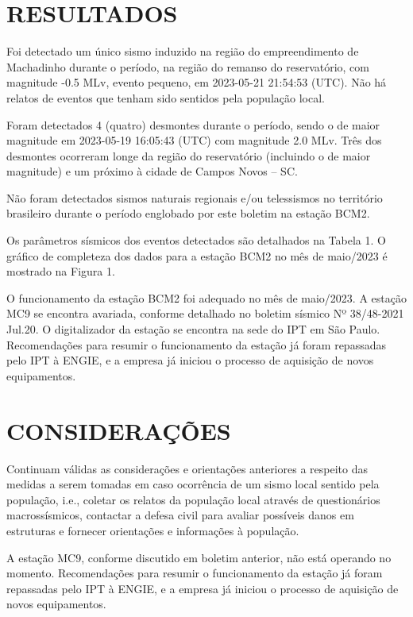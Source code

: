 \documentclass[12pt]{iptex}
\begin{document}
\section{RESULTADOS}
\label{sec:resultados}
Foi detectado um único sismo induzido na região do empreendimento de Machadinho durante o período, na região do remanso do reservatório, com magnitude -0.5 MLv, evento pequeno, em 2023-05-21 21:54:53 (UTC). Não há relatos de eventos que tenham sido sentidos pela população local.

Foram detectados 4 (quatro) desmontes durante o período, sendo o de maior magnitude em 2023-05-19 16:05:43 (UTC) com magnitude 2.0 MLv. Três dos desmontes ocorreram longe da região do reservatório (incluindo o de maior magnitude) e um próximo à cidade de Campos Novos – SC.

Não foram detectados sismos naturais regionais e/ou telessismos no território brasileiro durante o período englobado por este boletim na estação BCM2.

Os parâmetros sísmicos dos eventos detectados são detalhados na Tabela 1. O gráfico de completeza dos dados para a estação BCM2 no mês de maio/2023 é mostrado na Figura 1.

O funcionamento da estação BCM2 foi adequado no mês de maio/2023. A estação MC9 se encontra avariada, conforme detalhado no boletim sísmico Nº 38/48-2021 Jul.20. O digitalizador da estação se encontra na sede do IPT em São Paulo. Recomendações para resumir o funcionamento da estação já foram repassadas pelo IPT à ENGIE, e a empresa já iniciou o processo de aquisição de novos equipamentos.

\section{CONSIDERAÇÕES}
\label{sec:consideracoes}
Continuam válidas as considerações e orientações anteriores a respeito das medidas a serem tomadas em caso ocorrência de um sismo local sentido pela população, i.e., coletar os relatos da população local através de questionários macrossísmicos, contactar a defesa civil para avaliar possíveis danos em estruturas e fornecer orientações e informações à população.

A estação MC9, conforme discutido em boletim anterior, não está operando no momento. Recomendações para resumir o funcionamento da estação já foram repassadas pelo IPT à ENGIE, e a empresa já iniciou o processo de aquisição de novos equipamentos.

\end{document}
